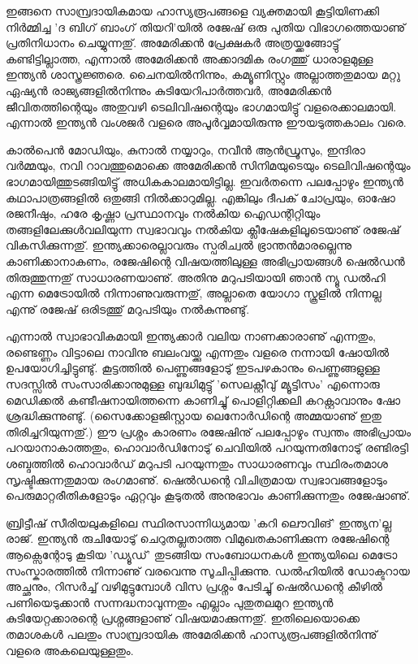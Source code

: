 ഇങ്ങനെ സാമ്പ്രദായികമായ ഹാസ്യരൂപങ്ങളെ വ്യക്തമായി കൂട്ടിയിണക്കി നിര്‍മ്മിച്ച 'ദ ബിഗ് ബാംഗ് തിയറി'യില്‍ രജേഷ് ഒരു 
പുതിയ വിഭാഗത്തെയാണു് പ്രതിനിധാനം ചെയ്യുന്നതു്. അമേരിക്കന്‍ പ്രേക്ഷകര്‍ അത്രയ്ക്കങ്ങോട്ടു് കണ്ടിട്ടില്ലാത്ത, എന്നാല്‍ അമേരിക്കന്‍ 
അക്കാദമിക രംഗത്തു് ധാരാളമുള്ള ഇന്ത്യന്‍ ശാസ്ത്രജ്ഞരെ. ചൈനയില്‍നിന്നും, കമ്യൂണിസ്റ്റും അല്ലാത്തതുമായ മറ്റു ഏഷ്യന്‍ 
രാജ്യങ്ങളില്‍നിന്നും കുടിയേറിപാര്‍ത്തവര്‍, അമേരിക്കന്‍ ജീവിതത്തിന്റെയും അതുവഴി ടെലിവിഷന്റെയും ഭാഗമായിട്ടു് വളരെക്കാലമായി. 
എന്നാല്‍ ഇന്ത്യന്‍ വംശജര്‍ വളരെ അപൂര്‍വ്വമായിരുന്നു ഈയടുത്തകാലം വരെ.

കാല്‍പെന്‍ മോഡിയും, കുനാല്‍ നയ്യാറും, നവീന്‍ ആന്‍ഡ്രൂസും, ഇന്ദിരാ വര്‍മ്മയും, നവി റാവത്തുമൊക്കെ അമേരിക്കന്‍ 
സിനിമയുടെയും ടെലിവിഷന്റെയും ഭാഗമായിത്തുടങ്ങിയിട്ടു് അധികകാലമായിട്ടില്ല. ഇവര്‍തന്നെ പലപ്പോഴും ഇന്ത്യന്‍ കഥാപാത്രങ്ങളില്‍ 
ഒതുങ്ങി നില്‍ക്കാറുമില്ല. എങ്കിലും ദീപക് ചോപ്രയും, ഓഷോ രജനീഷും, ഹരേ കൃഷ്ണാ പ്രസ്ഥാനവും നല്‍കിയ ഐഡന്റിറ്റിയും 
തങ്ങളിലേക്കുള്‍വലിയുന്ന സ്വഭാവവും നല്‍കിയ ക്ലീഷേകളിലൂടെയാണു് രജേഷ് വികസിക്കുന്നതു്. ഇന്ത്യക്കാരെല്ലാവരും സ്പരിച്വല്‍ 
ഭ്രാന്തന്‍മാരല്ലെന്നു കാണിക്കാനാകണം, രജേഷിന്റെ വിഷയത്തിലുള്ള അഭിപ്രായങ്ങള്‍ ഷെല്‍ഡന്‍ തിരുത്തുന്നതു് സാധാരണയാണു്.
 അതിനു മറുപടിയായി ഞാന്‍ ന്യൂ ഡല്‍ഹി എന്ന മെട്രോയില്‍ നിന്നാണുവരുന്നതു്, അല്ലാതെ യോഗാ സ്കൂളില്‍ നിന്നല്ല എന്നു് 
 രജേഷ് ഒരിടത്തു് മറുപടിയും നല്‍കുന്നുണ്ടു്.

എന്നാല്‍ സ്വാഭാവികമായി ഇന്ത്യക്കാര്‍ വലിയ നാണക്കാരാണു് എന്നതും, രണ്ടെണ്ണം വിട്ടാലെ നാവിനു ബലംവയ്ക്കു എന്നതും 
വളരെ നന്നായി ഷോയില്‍ ഉപയോഗിച്ചിട്ടുണ്ടു്. കൂട്ടത്തില്‍ പെണ്ണുങ്ങളോടു് ഇടപഴകാനും പെണ്ണുങ്ങളുള്ള സദസ്സില്‍ 
സംസാരിക്കാനുമുള്ള ബുദ്ധിമുട്ടു് 'സെലക്റ്റീവു് മ്യൂട്ടിസം' എന്നൊരു മെഡിക്കല്‍ കണ്ടീഷനായിത്തന്നെ കാണിച്ചു് പൊളിറ്റിക്കലി
 കറക്റ്റാവാനും ഷോ ശ്രദ്ധിക്കുന്നുണ്ടു്. (സൈക്കോളജിസ്റ്റായ ലെനോര്‍ഡിന്റെ അമ്മയാണു് ഇതു തിരിച്ചറിയുന്നതു്.) ഈ പ്രശ്നം കാരണം
  രജേഷിനു് പലപ്പോഴും സ്വന്തം അഭിപ്രായം പറയാനാകാത്തതും, ഹൊവാര്‍ഡിനോടു് ചെവിയില്‍ പറയുന്നതിനോടു് രണ്ടിരട്ടി 
  ശബ്ദത്തില്‍ ഹൊവാര്‍ഡ് മറുപടി പറയുന്നതും സാധാരണവും സ്ഥിരംതമാശ സൃഷ്ടിക്കുന്നതുമായ രംഗമാണു്. ഷെല്‍ഡന്റെ 
  വിചിത്രമായ സ്വഭാവങ്ങളോടും പെരുമാറ്റരീതികളോടും ഏറ്റവും കൂടുതല്‍ അനുഭാവം കാണിക്കുന്നതും രജേഷാണു്.

ബ്രിട്ടീഷ് സീരിയലുകളിലെ സ്ഥിരസാന്നിധ്യമായ 'കറി ലൌവിങ്' ഇന്ത്യന'ല്ല രാജ്. ഇന്ത്യന്‍ രുചിയോടു് ചെറുതല്ലതാത്ത
 വിമുഖതകാണിക്കുന്ന രജേഷിന്റെ ആക്സെന്റോടു കൂടിയ 'ഡ്യൂഡ്' തുടങ്ങിയ സംബോധനകള്‍ ഇന്ത്യയിലെ മെട്രോ
  സംസ്കാരത്തില്‍ നിന്നാണു് വരവെന്നു സൂചിപ്പിക്കുന്നു.
ഡല്‍ഹിയില്‍ ഡോക്ടറായ അച്ഛനും, റിസര്‍ച്ച് വഴിമുട്ടുമ്പോള്‍ വിസ പ്രശ്നം പേടിച്ചു് ഷെല്‍ഡന്റെ കീഴില്‍ പണിയെടുക്കാന്‍ 
സന്നദ്ധനാവുന്നതും എല്ലാം പുതുതലമുറ ഇന്ത്യന്‍ കുടിയേറ്റക്കാരന്റെ പ്രശ്നങ്ങളാണു് വിഷയമാക്കുന്നതു്. ഇതിലെയൊക്കെ തമാശകള്‍ 
പലതും സാമ്പ്രദായിക അമേരിക്കന്‍ ഹാസ്യരൂപങ്ങളില്‍നിന്നു് വളരെ അകലെയുള്ളതും.

